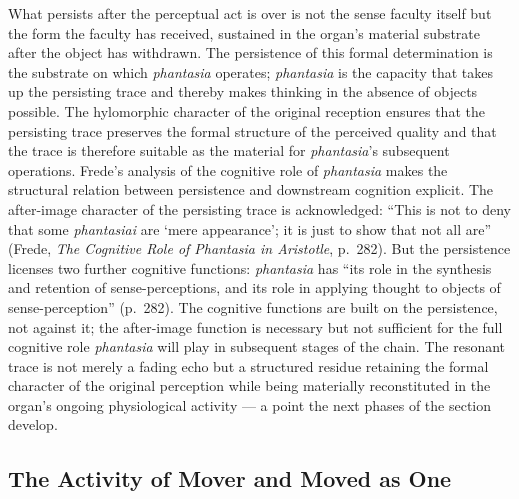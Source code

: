 \documentclass{article}
\begin{document}
What persists after the perceptual act is over is not the sense faculty itself but the form the faculty has received, sustained in the organ's material substrate after the object has withdrawn. The persistence of this formal determination is the substrate on which \textit{phantasia} operates; \textit{phantasia} is the capacity that takes up the persisting trace and thereby makes thinking in the absence of objects possible. The hylomorphic character of the original reception ensures that the persisting trace preserves the formal structure of the perceived quality and that the trace is therefore suitable as the material for \textit{phantasia}'s subsequent operations. Frede's analysis of the cognitive role of \textit{phantasia} makes the structural relation between persistence and downstream cognition explicit. The after-image character of the persisting trace is acknowledged: ``This is not to deny that some \textit{phantasiai} are `mere appearance'; it is just to show that not all are'' (Frede, \textit{The Cognitive Role of Phantasia in Aristotle}, p.~282). But the persistence licenses two further cognitive functions: \textit{phantasia} has ``its role in the synthesis and retention of sense-perceptions, and its role in applying thought to objects of sense-perception'' (p.~282). The cognitive functions are built on the persistence, not against it; the after-image function is necessary but not sufficient for the full cognitive role \textit{phantasia} will play in subsequent stages of the chain. The resonant trace is not merely a fading echo but a structured residue retaining the formal character of the original perception while being materially reconstituted in the organ's ongoing physiological activity --- a point the next phases of the section develop.

\subsection{The Activity of Mover and Moved as One}
\end{document}
